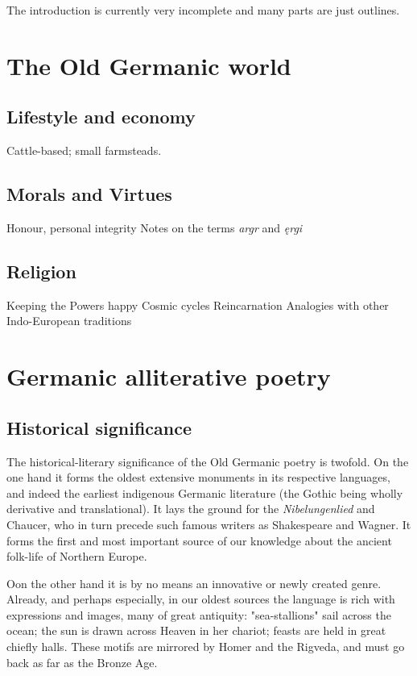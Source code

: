 \newpage

\thispagestyle{empty}

\newpage



The introduction is currently very incomplete and many parts are just outlines.

\section{The Old Germanic world}

  \subsection{Lifestyle and economy}
    Cattle-based; small farmsteads.
  \subsection{Morals and Virtues}
    Honour, personal integrity
    Notes on the terms \emph{argr} and \emph{ęrgi}
  \subsection{Religion}
    Keeping the Powers happy
    Cosmic cycles
    Reincarnation
    Analogies with other Indo-European traditions


\section{Germanic alliterative poetry}

  \subsection{Historical significance}

  The historical-literary significance of the Old Germanic poetry is twofold. On the one hand it forms the oldest extensive monuments in its respective languages, and indeed the earliest indigenous Germanic literature (the Gothic being wholly derivative and translational).  It lays the ground for the \emph{Nibelungenlied} and Chaucer, who in turn precede such famous writers as Shakespeare and Wagner.  It forms the first and most important source of our knowledge about the ancient folk-life of Northern Europe.

  Oon the other hand it is by no means an innovative or newly created genre. Already, and perhaps especially, in our oldest sources the language is rich with expressions and images, many of great antiquity: "sea-stallions" sail across the ocean; the sun is drawn across Heaven in her chariot; feasts are held in great chiefly halls. These motifs are mirrored by Homer and the Rigveda, and must go back as far as the Bronze Age.

